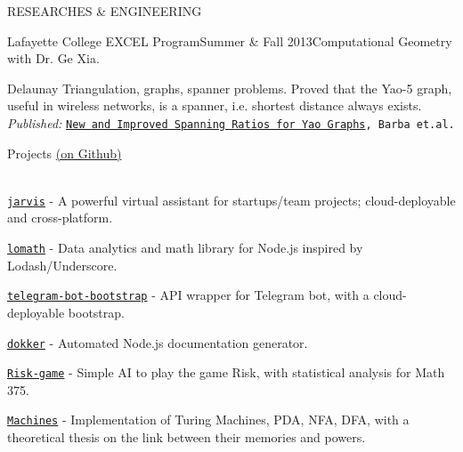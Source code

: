 \documentclass{resume} %
\begin{document}
\begin{rSection}{RESEARCHES \& ENGINEERING}

\begin{rSubsection}{Lafayette College EXCEL Program}{Summer \& Fall 2013}{Computational Geometry with Dr. Ge Xia.}{}
\item Delaunay Triangulation, graphs, spanner problems. Proved that the Yao-5 graph, useful in wireless networks, is a spanner, i.e. shortest distance always exists.\\
{\em Published:} {\tt \href{http://arxiv.org/abs/1307.5829}{\textcolor{Cerulean}{New and Improved Spanning Ratios for Yao Graphs}}, Barba et.al.}
\end{rSubsection}


\end{rSection}



\begin{rSection}{Projects \href{https://github.com/kengz}{(on Github)}}

{\setlength{\parskip}{1.8pt}

\ \\
{\tt \href{https://github.com/kengz/jarvis}{\textcolor{Cerulean}{jarvis}}} - A powerful virtual assistant for startups/team projects; cloud-deployable and cross-platform.

{\tt \href{https://github.com/kengz/lomath}{\textcolor{Cerulean}{lomath}}} - Data analytics and math library for Node.js inspired by Lodash/Underscore.



{\tt \href{https://github.com/kengz/telegram-bot-bootstrap}{\textcolor{Cerulean}{telegram-bot-bootstrap}}} - API wrapper for Telegram bot, with a cloud-deployable bootstrap.

{\tt \href{https://github.com/kengz/dokker}{\textcolor{Cerulean}{dokker}}} - Automated Node.js documentation generator.

{\tt \href{https://github.com/kengz/Risk-game}{\textcolor{Cerulean}{Risk-game}}} - Simple AI to play the game Risk, with statistical analysis for Math 375.

{\tt \href{https://github.com/kengz/Machines}{\textcolor{Cerulean}{Machines}}} - Implementation of Turing Machines, PDA, NFA, DFA, with a theoretical thesis on the link between their memories and powers.
}
\end{rSection}
\end{document}
